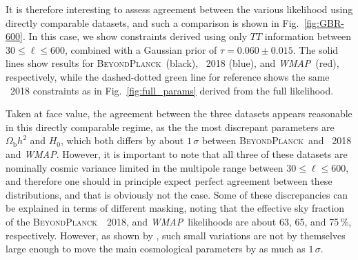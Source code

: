 \documentclass[onecolumn]{aa}
\def\WMAP{\textit{WMAP}}
\newcommand{\BP}{\textsc{BeyondPlanck}}
\begin{document}
It is therefore interesting to assess agreement between the various
likelihood using directly comparable datasets, and such a comparison
is shown in Fig.~\ref{fig:GBR-600}. In this case, we show constraints
derived using only $TT$ information between $30\le\ell\le600$,
combined with a Gaussian prior of $\tau=0.060\pm0.015$. The solid
lines show results for \BP\ (black), \Planck\ 2018 (blue), and
\WMAP\ (red), respectively, while the dashed-dotted green line for
reference shows the same \Planck\ 2018 constraints as in
Fig.~\ref{fig:full_params} derived from the full likelihood.

Taken at face value, the agreement between the three datasets appears
reasonable in this directly comparable regime, as the the most
discrepant parameters are $\Omega_{\mathrm{b}}h^2$ and $H_0$, which
both differs by about $1\,\sigma$ between \BP\ and \Planck\ 2018 and
\WMAP. However, it is important to note that all three of these datasets
are nominally cosmic variance limited in the multipole range between
$30\le\ell\le 600$, and therefore one should in principle expect
perfect agreement between these distributions, and that is obviously
not the case. Some of these discrepancies can be explained in terms of
different masking, noting that the effective sky fraction of the \BP\,
\Planck\ 2018, and \WMAP\ likelihoods are about 63, 65, and 75\,\%,
respectively. However, as shown by \citet{planck2016-l05}, such small
variations are not by themselves large enough to move the main
cosmological parameters by as much as $1\,\sigma$.
\end{document}
